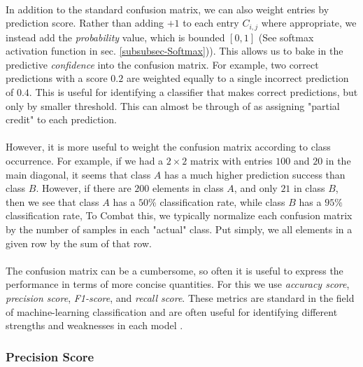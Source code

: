 \documentclass[12pt,letterpaper]{article}
\begin{document}
\paragraph*{}In addition to the standard confusion matrix, we can also weight entries by prediction score. Rather than adding $+1$ to each entry $C_{i,j}$ where appropriate, we instead add the \textit{probability} value, which is bounded $[0,1]$ (See softmax activation function in sec. \ref{subsubsec-Softmax})). This allows us to bake in the predictive \textit{confidence} into the confusion matrix. For example, two correct predictions with a score $0.2$ are weighted equally to a single incorrect prediction of $0.4$. This is useful for identifying a classifier that makes correct predictions, but only by smaller threshold. This can almost be through of as assigning "partial credit" to each prediction.

\paragraph*{}However, it is more useful to weight the confusion matrix according to class occurrence. For example, if we had a $2 \times 2$ matrix with entries $100$ and $20$ in the main diagonal, it seems that class $A$ has a much higher prediction success than class $B$. However, if there are $200$ elements in class $A$, and only $21$ in class $B$, then we see that class $A$ has a $50\%$ classification rate, while class $B$ has a $95\%$ classification rate, To Combat this, we typically normalize each confusion matrix by the number of samples in each "actual" class. Put simply, we all elements in a given row by the sum of that row.

\paragraph*{}The confusion matrix can be a cumbersome, so often it is useful to express the performance in terms of more concise quantities. For this we use \textit{accuracy score}, \textit{precision score}, \textit{F1-score}, and \textit{recall score}. These metrics are standard in the field of machine-learning classification and are often useful for identifying different strengths and weaknesses in each model \cite{Geron,James}.


\subsubsection{Precision Score}
\end{document}
